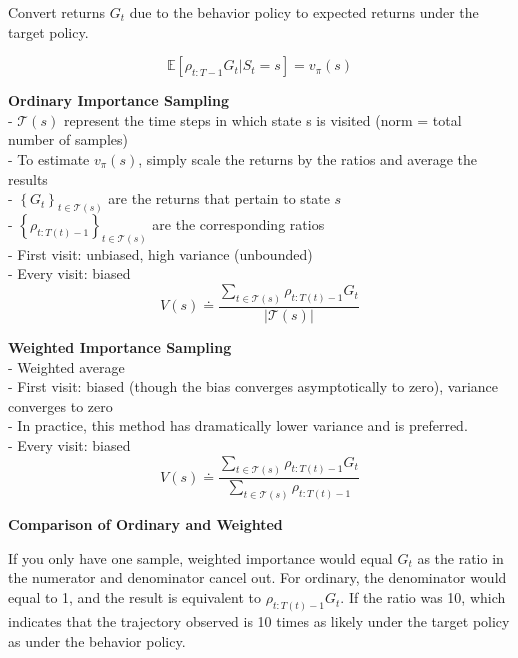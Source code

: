 \documentclass{article}
\begin{document}
\noindent
Convert returns $G_{t}$ due to the behavior policy to expected returns under the
target policy.

\begin{equation}
\mathbb{E}\left[\rho_{t: T-1} G_{t} | S_{t}=s\right]=v_{\pi}(s)
\end{equation}

\noindent
\textbf{Ordinary Importance Sampling}\\
- $\mathcal{T}(s)$ represent the time steps in which state s is visited (norm =
total number of samples)\\
- To estimate $v_{\pi}(s)$, simply scale the returns by the ratios and average
the results\\
- $\left\{G_{t}\right\}_{t \in \mathcal{T}(s)}$ are the returns that pertain to
state $s$ \\
- $\left\{\rho_{t: T(t)-1}\right\}_{t \in \mathcal{T}(s)}$ are the corresponding
ratios\\
- First visit: unbiased, high variance (unbounded)\\
- Every visit: biased
\begin{equation}
V(s) \doteq \frac{\sum_{t \in \mathcal{T}(s)} \rho_{t: T(t)-1} G_{t}}{|\mathcal{T}(s)|}
\end{equation}

\noindent
\textbf{Weighted Importance Sampling}\\
- Weighted average\\
- First visit: biased (though the bias converges asymptotically to zero), variance converges to zero\\
- In practice, this method has dramatically lower variance and is preferred.\\
- Every visit: biased
\begin{equation}
V(s) \doteq \frac{\sum_{t \in \mathcal{T}(s)} \rho_{t: T(t)-1} G_{t}}{\sum_{t \in \mathcal{T}(s)} \rho_{t: T(t)-1}}
\end{equation}

\noindent
\textbf{Comparison of Ordinary and Weighted}

\noindent
If you only have one sample, weighted importance would equal $G_{t}$ as the
ratio in the numerator and denominator cancel out. For ordinary, the denominator
would equal to 1, and the result is equivalent to $\rho_{t: T(t)-1} G_{t}$. If
the ratio was 10, which indicates that the trajectory observed is 10 times as
likely under the target policy as under the behavior policy.\\
\end{document}
